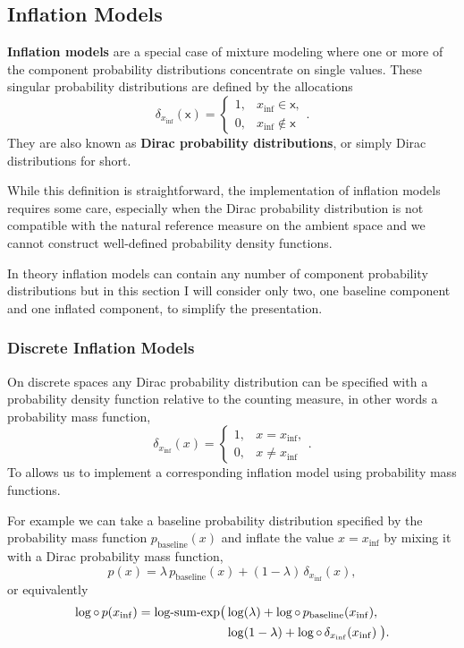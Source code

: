 \documentclass[
  letterpaper,
  DIV=11,
  numbers=noendperiod]{scrartcl}
\begin{document}
\subsection{Inflation Models}\label{sec:inflation}

\textbf{Inflation models} are a special case of mixture modeling where
one or more of the component probability distributions concentrate on
single values. These singular probability distributions are defined by
the allocations \[
\delta_{x_{\mathrm{inf}}}( \mathsf{x} )
=
\left\{
\begin{array}{rl}
1, & x_{\mathrm{inf}} \in    \mathsf{x}, \\
0, & x_{\mathrm{inf}} \notin \mathsf{x}
\end{array}
\right. .
\] They are also known as \textbf{Dirac probability distributions}, or
simply Dirac distributions for short.

While this definition is straightforward, the implementation of
inflation models requires some care, especially when the Dirac
probability distribution is not compatible with the natural reference
measure on the ambient space and we cannot construct well-defined
probability density functions.

In theory inflation models can contain any number of component
probability distributions but in this section I will consider only two,
one baseline component and one inflated component, to simplify the
presentation.

\subsubsection{Discrete Inflation
Models}\label{discrete-inflation-models}

On discrete spaces any Dirac probability distribution can be specified
with a probability density function relative to the counting measure, in
other words a probability mass function, \[
\delta_{x_{\mathrm{inf}}}(x)
=
\left\{
\begin{array}{rl}
1, & x =   x_{\mathrm{inf}}, \\
0, & x \ne x_{\mathrm{inf}}
\end{array}
\right. .
\] To allows us to implement a corresponding inflation model using
probability mass functions.

For example we can take a baseline probability distribution specified by
the probability mass function \(p_{\mathrm{baseline}}(x)\) and inflate
the value \(x = x_{\mathrm{inf}}\) by mixing it with a Dirac probability
mass function, \[
p(x) =
  \lambda \, p_{\mathrm{baseline}}(x)
+ (1 - \lambda) \, \delta_{x_{\mathrm{inf}}}(x),
\] or equivalently \begin{align*}
\log \circ \, p (x_{\mathrm{inf}})
&=
\text{log-sum-exp}\big(
  \log(\lambda)
+ \log \circ \, p_{\mathrm{baseline}} (x_{\mathrm{inf}}),
\\
&
\hphantom{=\text{log-sum-exp}\big(\;}
  \log(1 - \lambda)
+ \log \circ \, \delta_{x_{\mathrm{inf}}} (x_{\mathrm{inf}}) \; \big).
\end{align*}
\end{document}
